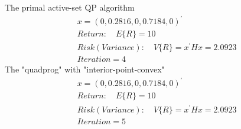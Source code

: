 The
primal active-set QP algorithm
\begin{align*}
&    x=(0,0.2816,0,0.7184,0)^{\prime}\\
&Return: \quad E\{ R\}=10\\
&Risk(Variance):\quad V\{ R\}=x^{\prime}Hx=2.0923\\
&Iteration=4
\end{align*}
The "quadprog" with "interior-point-convex"
\begin{align*}
&    x=(0,0.2816,0,0.7184,0)^{\prime}\\
&Return: \quad E\{ R\}=10\\
&Risk(Variance):\quad V\{ R\}=x^{\prime}Hx=2.0923\\
&Iteration=5
\end{align*}